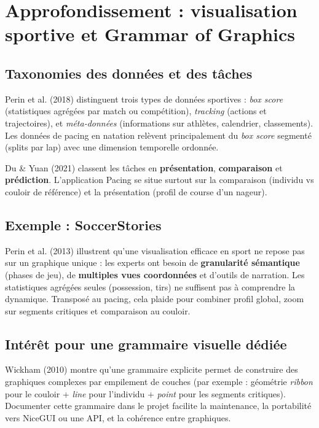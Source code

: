 \documentclass[11pt,a4paper]{article}
\begin{document}
\section{Approfondissement : visualisation sportive et Grammar of Graphics}

\subsection{Taxonomies des données et des tâches}
Perin et al. (2018) distinguent trois types de données sportives : \textit{box score} (statistiques agrégées par match ou compétition), \textit{tracking} (actions et trajectoires), et \textit{méta-données} (informations sur athlètes, calendrier, classements). Les données de pacing en natation relèvent principalement du \textit{box score} segmenté (splits par lap) avec une dimension temporelle ordonnée.

Du \& Yuan (2021) classent les tâches en \textbf{présentation}, \textbf{comparaison} et \textbf{prédiction}. L'application Pacing se situe surtout sur la comparaison (individu vs couloir de référence) et la présentation (profil de course d'un nageur).

\subsection{Exemple : SoccerStories}
Perin et al. (2013) illustrent qu'une visualisation efficace en sport ne repose pas sur un graphique unique : les experts ont besoin de \textbf{granularité sémantique} (phases de jeu), de \textbf{multiples vues coordonnées} et d'outils de narration. Les statistiques agrégées seules (possession, tirs) ne suffisent pas à comprendre la dynamique. Transposé au pacing, cela plaide pour combiner profil global, zoom sur segments critiques et comparaison au couloir.

\subsection{Intérêt pour une grammaire visuelle dédiée}
Wickham (2010) montre qu'une grammaire explicite permet de construire des graphiques complexes par empilement de couches (par exemple : géométrie \textit{ribbon} pour le couloir + \textit{line} pour l'individu + \textit{point} pour les segments critiques). Documenter cette grammaire dans le projet facilite la maintenance, la portabilité vers NiceGUI ou une API, et la cohérence entre graphiques.
\end{document}
